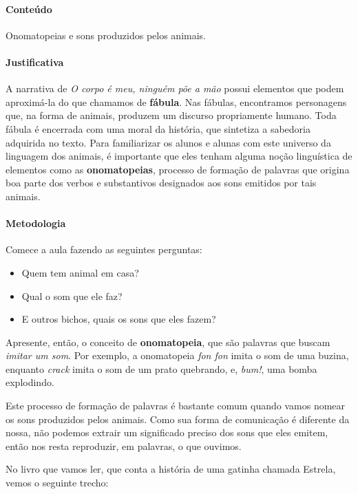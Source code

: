 \documentclass[11pt]{extarticle}
\begin{document}
\paragraph{Conteúdo} Onomatopeias e sons produzidos pelos animais.

\paragraph{Justificativa} A narrativa de \textit{O corpo é meu, ninguém põe a mão}
possui elementos que podem aproximá-la do que chamamos de \textbf{fábula}. 
Nas fábulas, encontramos personagens que, na forma de animais, produzem um discurso
propriamente humano. Toda fábula é encerrada com uma moral da história, que sintetiza a sabedoria adquirida no texto. 
Para familiarizar os alunos e alunas com este universo da linguagem dos animais,
é importante que eles tenham alguma noção linguística de elementos como as
\textbf{onomatopeias}, processo de formação de palavras que origina
boa parte dos verbos e substantivos designados aos sons emitidos por tais animais. 

\paragraph{Metodologia} Comece a aula fazendo as seguintes perguntas:

\begin{itemize}
	\item Quem tem animal em casa?
	\item Qual o som que ele faz?
	\item E outros bichos, quais os sons que eles fazem?
\end{itemize}

Apresente, então, o conceito de \textbf{onomatopeia}, que são palavras
que buscam \textit{imitar um som}. Por exemplo, a onomatopeia \textit{fon fon}
imita o som de uma buzina, enquanto \textit{crack} imita o som de um prato quebrando,
e, \textit{bum!}, uma bomba explodindo.

Este processo de formação de palavras é bastante comum quando vamos nomear os
sons produzidos pelos animais. Como sua forma de comunicação é diferente da nossa,
não podemos extrair um significado preciso dos sons que eles emitem, então
nos resta reproduzir, em palavras, o que ouvimos. 

No livro que vamos ler, que conta a história de uma gatinha chamada Estrela, 
vemos o seguinte trecho:

\end{document}
